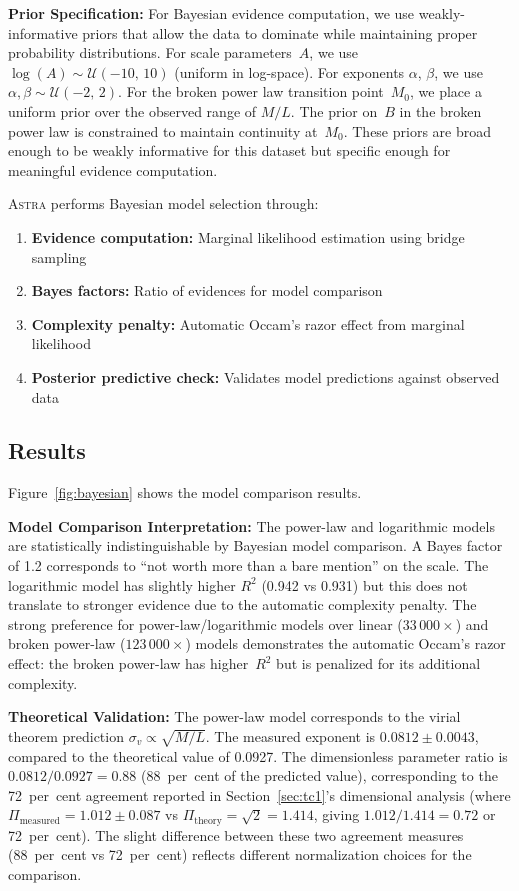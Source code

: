 \documentclass[fleqn,usenatbib]{mnras}
\newcommand{\astra}{\textsc{Astra}\xspace}
\begin{document}
\textbf{Prior Specification:}
For Bayesian evidence computation, we use weakly-informative priors that allow the data to dominate while maintaining proper probability distributions.
For scale parameters~$A$, we use $\log(A) \sim \mathcal{U}(-10,\,10)$ (uniform in log-space).
For exponents $\alpha$, $\beta$, we use $\alpha, \beta \sim \mathcal{U}(-2,\,2)$.
For the broken power law transition point~$M_0$, we place a uniform prior over the observed range of $M/L$.
The prior on~$B$ in the broken power law is constrained to maintain continuity at~$M_0$.
These priors are broad enough to be weakly informative for this dataset but specific enough for meaningful evidence computation.

\astra performs Bayesian model selection through:
\begin{enumerate}
  \item[(i)] \textbf{Evidence computation:} Marginal likelihood estimation using bridge sampling \citep{MengWong1996}
  \item[(ii)] \textbf{Bayes factors:} Ratio of evidences for model comparison \citep{KassRaftery1995}
  \item[(iii)] \textbf{Complexity penalty:} Automatic Occam's razor effect from marginal likelihood
  \item[(iv)] \textbf{Posterior predictive check:} Validates model predictions against observed data
\end{enumerate}

\subsection{Results}
\label{sec:tc5:results}

Figure~\ref{fig:bayesian} shows the model comparison results.

\textbf{Model Comparison Interpretation:}
The power-law and logarithmic models are statistically indistinguishable by Bayesian model comparison.
A Bayes factor of 1.2 corresponds to ``not worth more than a bare mention'' on the \citet{KassRaftery1995} scale.
The logarithmic model has slightly higher $R^2$ (0.942 vs 0.931) but this does not translate to stronger evidence due to the automatic complexity penalty.
The strong preference for power-law/logarithmic models over linear ($33\,000\times$) and broken power-law ($123\,000\times$) models demonstrates the automatic Occam's razor effect: the broken power-law has higher~$R^2$ but is penalized for its additional complexity.

\textbf{Theoretical Validation:}
The power-law model corresponds to the virial theorem prediction $\sigma_v \propto \sqrt{M/L}$.
The measured exponent is $0.0812 \pm 0.0043$, compared to the theoretical value of 0.0927.
The dimensionless parameter ratio is $0.0812/0.0927 = 0.88$ (88~per~cent of the predicted value), corresponding to the 72~per~cent agreement reported in Section~\ref{sec:tc1}'s dimensional analysis (where $\Pi_{\mathrm{measured}} = 1.012 \pm 0.087$ vs $\Pi_{\mathrm{theory}} = \sqrt{2} = 1.414$, giving $1.012/1.414 = 0.72$ or 72~per~cent).
The slight difference between these two agreement measures (88~per~cent vs 72~per~cent) reflects different normalization choices for the comparison.
\end{document}
